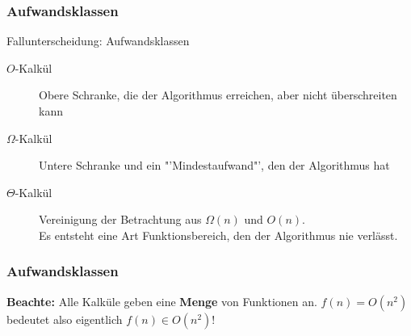 \begin{frame}
			\frametitle{Aufwandsklassen}
			\begin{block}{Fallunterscheidung: Aufwandsklassen}
                \begin{description}
                    \item[$O$-Kalkül] Obere Schranke, die der Algorithmus erreichen, aber nicht überschreiten kann
                    \item[$\Omega$-Kalkül] Untere Schranke und ein "'Mindestaufwand"', den der Algorithmus hat
					\item[$\Theta$-Kalkül] Vereinigung der Betrachtung aus $\Omega(n)$ und $O(n)$.\\
						Es entsteht eine Art Funktionsbereich, den der Algorithmus nie verlässt.
                \end{description}
			\end{block}
\end{frame}


\begin{frame}
			\frametitle{Aufwandsklassen}
		\begin{block}{\bf Beachte:}
		Alle Kalküle geben eine {\bf Menge} von Funktionen an. $f(n) = O(n^2)$ bedeutet also eigentlich $f(n) \in O(n^2)$!
		\end{block}
\end{frame}

